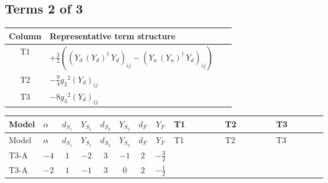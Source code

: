 \documentclass[8pt]{article}
\begin{document}
\begin{landscape}
\subsection*{Terms 2 of 3}
\begin{center}
\begin{tabular}{@{}c >{\raggedright\arraybackslash}p{0.82\linewidth}@{}}
\toprule
Column & Representative term structure \\
\midrule
T1 & \(\displaystyle +\frac{3}{2} (\left({Y_d}\,\left({Y_d}\right)^{\dagger}\,{Y_d}\right)_{ij}-\left({Y_u}\,\left({Y_u}\right)^{\dagger}\,{Y_d}\right)_{ij})\) \\
\midrule
T2 & \(\displaystyle -\frac{9}{4} {g_2}^2 \left({Y_d}\right)_{ij}\) \\
\midrule
T3 & \(\displaystyle -8 {g_3}^2 \left({Y_d}\right)_{ij}\) \\
\midrule
\bottomrule
\end{tabular}
\end{center}
\smallskip
\tiny
\begin{longtable}{@{}llcccccc >{\raggedright\arraybackslash}p{0.21\linewidth} >{\raggedright\arraybackslash}p{0.21\linewidth} >{\raggedright\arraybackslash}p{0.21\linewidth}@{}}
\toprule
Model & $\alpha$ & $d_{S_1}$ & $Y_{S_1}$ & $d_{S_2}$ & $Y_{S_2}$ & $d_F$ & $Y_F$ & T1 & T2 & T3 \\
\midrule
\endfirsthead
\toprule
Model & $\alpha$ & $d_{S_1}$ & $Y_{S_1}$ & $d_{S_2}$ & $Y_{S_2}$ & $d_F$ & $Y_F$ & T1 & T2 & T3 \\
\midrule
\endhead
T3-A & $-4$ & $1$ & $-2$ & $3$ & $-1$ & $2$ & $-\frac{3}{2}$ & \scriptsize\adjustbox{max width=\linewidth}{$\begin{gathered} +\frac{3}{2} (\left({Y_d}\,\left({Y_d}\right)^{\dagger}\,{Y_d}\right)_{ij}-\left({Y_u}\,\left({Y_u}\right)^{\dagger}\,{Y_d}\right)_{ij})\end{gathered}$} & \scriptsize\adjustbox{max width=\linewidth}{$\begin{gathered} -\frac{9}{4} {g_2}^2 \left({Y_d}\right)_{ij}\end{gathered}$} & \scriptsize\adjustbox{max width=\linewidth}{$\begin{gathered} -8 {g_3}^2 \left({Y_d}\right)_{ij}\end{gathered}$} \\
\midrule
T3-A & $-2$ & $1$ & $-1$ & $3$ & $0$ & $2$ & $-\frac{1}{2}$ & \scriptsize\adjustbox{max width=\linewidth}{$\begin{gathered} +\frac{3}{2} (\left({Y_d}\,\left({Y_d}\right)^{\dagger}\,{Y_d}\right)_{ij}-\left({Y_u}\,\left({Y_u}\right)^{\dagger}\,{Y_d}\right)_{ij})\end{gathered}$} & \scriptsize\adjustbox{max width=\linewidth}{$\begin{gathered} -\frac{9}{4} {g_2}^2 \left({Y_d}\right)_{ij}\end{gathered}$} & \scriptsize\adjustbox{max width=\linewidth}{$\begin{gathered} -8 {g_3}^2 \left({Y_d}\right)_{ij}\end{gathered}$} \\

\end{longtable}
\end{landscape}
\end{document}
